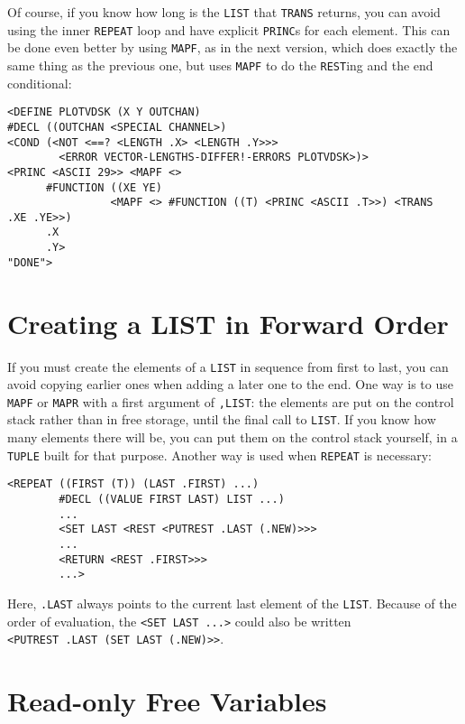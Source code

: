 \documentclass[a4paper]{scrbook}
\begin{document}
Of course, if you know how long is the \texttt{LIST} that \texttt{TRANS} returns, you can avoid using the inner
\texttt{REPEAT} loop and have explicit \texttt{PRINC}s for each element. This can be done even better by using
\texttt{MAPF}, as in the next version, which does exactly the same thing as the previous one, but uses \texttt{MAPF} to do
the \texttt{REST}ing and the end conditional:

\begin{verbatim}
<DEFINE PLOTVDSK (X Y OUTCHAN)
#DECL ((OUTCHAN <SPECIAL CHANNEL>)
<COND (<NOT <==? <LENGTH .X> <LENGTH .Y>>>
        <ERROR VECTOR-LENGTHS-DIFFER!-ERRORS PLOTVDSK>)>
<PRINC <ASCII 29>> <MAPF <>
      #FUNCTION ((XE YE)
                <MAPF <> #FUNCTION ((T) <PRINC <ASCII .T>>) <TRANS
.XE .YE>>)
      .X
      .Y>
"DONE">
\end{verbatim}

\section{Creating a LIST in Forward Order}\label{creating-a-list-in-forward-order}

If you must create the elements of a \texttt{LIST} in sequence from first to last, you can avoid copying earlier ones when
adding a later one to the end. One way is to use \texttt{MAPF} or \texttt{MAPR} with a first argument of \texttt{,LIST}:
the elements are put on the control stack rather than in free storage, until the final call to \texttt{LIST}. If you know
how many elements there will be, you can put them on the control stack yourself, in a \texttt{TUPLE} built for that
purpose. Another way is used when \texttt{REPEAT} is necessary:

\begin{verbatim}
<REPEAT ((FIRST (T)) (LAST .FIRST) ...)
        #DECL ((VALUE FIRST LAST) LIST ...)
        ...
        <SET LAST <REST <PUTREST .LAST (.NEW)>>>
        ...
        <RETURN <REST .FIRST>>>
        ...>
\end{verbatim}

Here, \texttt{.LAST} always points to the current last element of the \texttt{LIST}. Because of the order of evaluation,
the \texttt{\textless{}SET\ LAST\ ...\textgreater{}} could also be written
\texttt{\textless{}PUTREST\ .LAST\ (SET\ LAST\ (.NEW)\textgreater{}\textgreater{}}.

\section{Read-only Free Variables}\label{read-only-free-variables}
\end{document}
